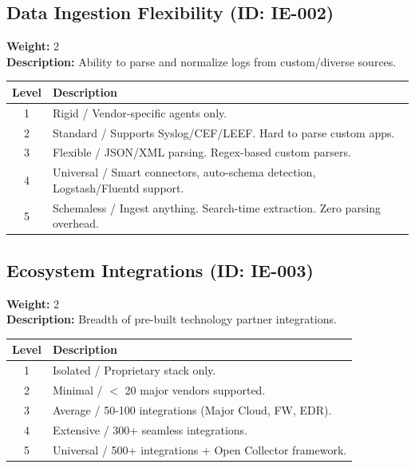 \documentclass{article}
\begin{document}
\subsection{Data Ingestion Flexibility (ID: IE-002)}
\textbf{Weight:} 2 \\
\textbf{Description:} Ability to parse and normalize logs from custom/diverse sources.
\vspace{0.3cm}
\begin{longtable}{|c|p{12cm}|}
\hline
\rowcolor{lightgray} \textbf{Level} & \textbf{Description} \\ \hline
1 & Rigid / Vendor-specific agents only. \\ \hline
2 & Standard / Supports Syslog/CEF/LEEF. Hard to parse custom apps. \\ \hline
3 & Flexible / JSON/XML parsing. Regex-based custom parsers. \\ \hline
4 & Universal / Smart connectors, auto-schema detection, Logstash/Fluentd support. \\ \hline
5 & Schemaless / Ingest anything. Search-time extraction. Zero parsing overhead. \\ \hline
\end{longtable}
\vspace{0.5cm}
\subsection{Ecosystem Integrations (ID: IE-003)}
\textbf{Weight:} 2 \\
\textbf{Description:} Breadth of pre-built technology partner integrations.
\vspace{0.3cm}
\begin{longtable}{|c|p{12cm}|}
\hline
\rowcolor{lightgray} \textbf{Level} & \textbf{Description} \\ \hline
1 & Isolated / Proprietary stack only. \\ \hline
2 & Minimal / $<$ 20 major vendors supported. \\ \hline
3 & Average / 50-100 integrations (Major Cloud, FW, EDR). \\ \hline
4 & Extensive / 300+ seamless integrations. \\ \hline
5 & Universal / 500+ integrations + Open Collector framework. \\ \hline
\end{longtable}
\vspace{0.5cm}
\end{document}

